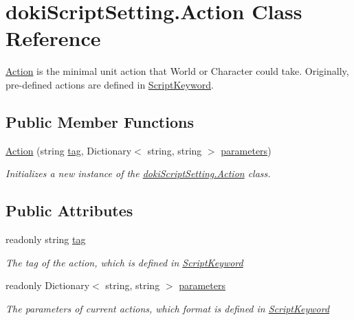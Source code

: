 \hypertarget{classdoki_script_setting_1_1_action}{}\section{doki\+Script\+Setting.\+Action Class Reference}
\label{classdoki_script_setting_1_1_action}


\hyperlink{classdoki_script_setting_1_1_action}{Action} is the minimal unit action that World or Character could take. Originally, pre-\/defined actions are defined in \hyperlink{classdoki_script_setting_1_1_script_keyword}{Script\+Keyword}.  


\subsection*{Public Member Functions}
\begin{DoxyCompactItemize}
\item 
\hyperlink{classdoki_script_setting_1_1_action_a86103481e751ad09d9e97e4c54f986de}{Action} (string \hyperlink{classdoki_script_setting_1_1_action_a064f0ac6300b34990c22deec21c3b161}{tag}, Dictionary$<$ string, string $>$ \hyperlink{classdoki_script_setting_1_1_action_ac01643b9ccadfc8c71dec610ac7bb611}{parameters})
\begin{DoxyCompactList}\small\item\em Initializes a new instance of the \hyperlink{classdoki_script_setting_1_1_action}{doki\+Script\+Setting.\+Action} class. \end{DoxyCompactList}\end{DoxyCompactItemize}
\subsection*{Public Attributes}
\begin{DoxyCompactItemize}
\item 
readonly string \hyperlink{classdoki_script_setting_1_1_action_a064f0ac6300b34990c22deec21c3b161}{tag}
\begin{DoxyCompactList}\small\item\em The tag of the action, which is defined in \hyperlink{classdoki_script_setting_1_1_script_keyword}{Script\+Keyword} \end{DoxyCompactList}\item 
readonly Dictionary$<$ string, string $>$ \hyperlink{classdoki_script_setting_1_1_action_ac01643b9ccadfc8c71dec610ac7bb611}{parameters}
\begin{DoxyCompactList}\small\item\em The parameters of current actions, which format is defined in \hyperlink{classdoki_script_setting_1_1_script_keyword}{Script\+Keyword} \end{DoxyCompactList}\end{DoxyCompactItemize}


